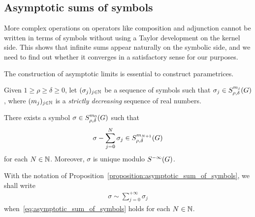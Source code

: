 \subsection{Asymptotic sums of symbols}

More complex operations on operators
like composition and adjunction
cannot be written in terms of symbols without using a Taylor development on the kernel side.
This shows that infinite sums appear naturally on the symbolic side,
and we need to find out whether it converges in a satisfactory sense for our purposes.

The construction of asymptotic limits is essential to construct parametrices.

\begin{proposition}
\label{proposition:asymptotic_sum_of_symbols}
    Given $1 \geq \rho \geq \delta \geq 0$,
    let $(\sigma_j)_{j \in \mathbb{N}}$ be a sequence of symbols such that $\sigma_j \in S^{m_j}_{\rho, \delta}(G)$,
    where $(m_j)_{j \in \mathbb{N}}$ is a \emph{strictly decreasing} sequence of real numbers.

    There exists a symbol $\sigma \in S^{m_0}_{\rho, \delta}(G)$
    such that
    \begin{align}
        \sigma - \sum_{j = 0}^N \sigma_j \in S^{m_{N + 1}}_{\rho, \delta}(G)
        \label{eq:asymptotic_sum_of_symbols}
    \end{align}
    for each $N \in \mathbb{N}$.
    Moreover, $\sigma$ is unique modulo ${S^{-\infty} (G)}$.
\end{proposition}

\begin{definition}
    With the notation of Proposition~\ref{proposition:asymptotic_sum_of_symbols},
    we shall write
    \begin{align*}
        \sigma \sim \sum_{j = 0}^{+\infty} \sigma_j
    \end{align*}
    when~\eqref{eq:asymptotic_sum_of_symbols} holds for each $N \in \mathbb{N}$.
\end{definition}

